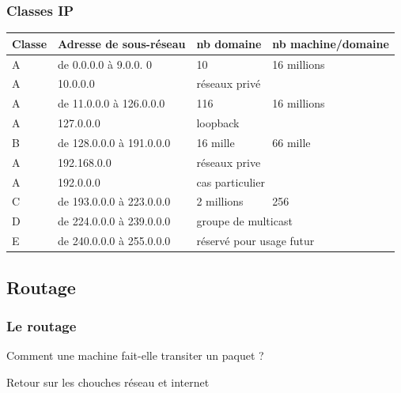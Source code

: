 %
\begin{frame}\frametitle{Classes IP}
    
\begin{table}[h]
\begin{tabular}{l|l|l|l}
Classe & Adresse de sous-réseau   & nb domaine     & nb machine/domaine   \\ \hline
    A  & de 0.0.0.0 à 9.0.0. 0    & 10             & 16 millions           \\ \hline
    A  & 10.0.0.0                 & \multicolumn{2}{l}{réseaux privé}       \\ \hline
    A  & de 11.0.0.0 à 126.0.0.0  & 116            & 16 millions             \\ \hline
    A  & 127.0.0.0                &\multicolumn{2}{l}{loopback}               \\ \hline
    B  & de 128.0.0.0 à 191.0.0.0 & 16 mille       & 66 mille                  \\ \hline
    A  & 192.168.0.0              & \multicolumn{2}{l}{réseaux prive}           \\ \hline
    A  & 192.0.0.0                & \multicolumn{2}{l}{cas particulier}           \\ \hline
    C  & de 193.0.0.0 à 223.0.0.0 & 2 millions     & 256                         \\ \hline
    D  & de 224.0.0.0 à 239.0.0.0 &\multicolumn{2}{l}{groupe de multicast}        \\ \hline
    E  & de 240.0.0.0 à 255.0.0.0 &\multicolumn{2}{l}{réservé pour usage futur}    \\ 
\end{tabular}
\end{table}

\end{frame}

\subsection{Routage}
\begin{frame}\frametitle{Le routage}

    {\Huge Comment une machine fait-elle transiter un paquet ?}

    \vspace{2em}

    Retour sur les chouches réseau et internet\\

\end{frame}

